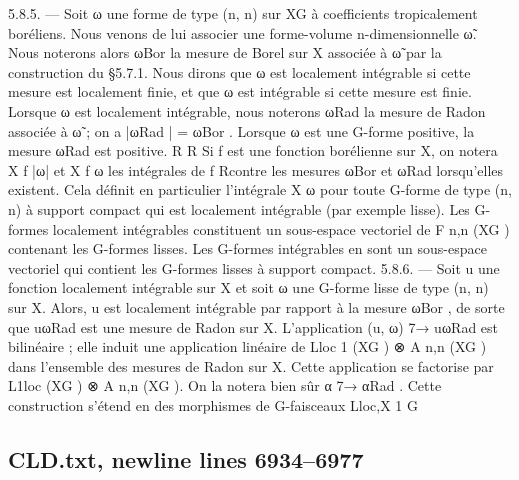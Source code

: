 \documentclass[
  10pt,
]{article}
\newenvironment{Shaded}{}{}
\newcommand{\NormalTok}[1]{#1}
\begin{document}
\begin{Shaded}
\begin{Highlighting}[]
\NormalTok{ 5.8.5. — Soit ω une forme de type (n, n) sur XG à coefficients tropicalement boréliens.}
\NormalTok{ Nous venons de lui associer une forme{-}volume n{-}dimensionnelle ω̃. Nous noterons alors}
\NormalTok{ ωBor la mesure de Borel sur X associée à ω̃ par la construction du §5.7.1.}
\NormalTok{   Nous dirons que ω est localement intégrable si cette mesure est localement finie, et}
\NormalTok{ que ω est intégrable si cette mesure est finie. Lorsque ω est localement intégrable, nous}
\NormalTok{ noterons ωRad la mesure de Radon associée à ω̃ ; on a |ωRad | = ωBor . Lorsque ω est une}
\NormalTok{ G{-}forme positive, la mesure ωRad est positive.         R           R}
\NormalTok{   Si f est une fonction borélienne sur X, on notera X f |ω| et X f ω les intégrales de f}
\NormalTok{Rcontre les mesures ωBor et ωRad lorsqu’elles existent. Cela définit en particulier l’intégrale}
\NormalTok{  X}
\NormalTok{    ω pour toute G{-}forme de type (n, n) à support compact qui est localement intégrable}
\NormalTok{(par exemple lisse).}
\NormalTok{   Les G{-}formes localement intégrables constituent un sous{-}espace vectoriel de F n,n (XG )}
\NormalTok{contenant les G{-}formes lisses. Les G{-}formes intégrables en sont un sous{-}espace vectoriel}
\NormalTok{qui contient les G{-}formes lisses à support compact.}
\NormalTok{5.8.6. — Soit u une fonction localement intégrable sur X et soit ω une G{-}forme lisse}
\NormalTok{de type (n, n) sur X. Alors, u est localement intégrable par rapport à la mesure ωBor ,}
\NormalTok{de sorte que uωRad est une mesure de Radon sur X.}
\NormalTok{   L’application (u, ω) 7→ uωRad est bilinéaire ; elle induit une application linéaire de}
\NormalTok{Lloc}
\NormalTok{   1}
\NormalTok{     (XG ) ⊗ A n,n (XG ) dans l’ensemble des mesures de Radon sur X. Cette application}
\NormalTok{se factorise par L1loc (XG ) ⊗ A n,n (XG ). On la notera bien sûr α 7→ αRad .}
\NormalTok{   Cette construction s’étend en des morphismes de G{-}faisceaux}
\NormalTok{                  Lloc,X}
\NormalTok{                    1}
\NormalTok{                        G}
\end{Highlighting}
\end{Shaded}

\subsection{CLD.txt, newline lines
6934--6977}\label{cld.txt-newline-lines-69346977}
\end{document}

